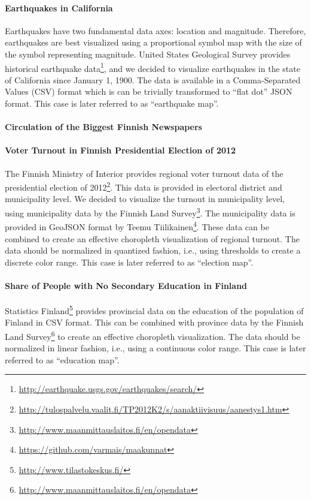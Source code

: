 \paragraph{Earthquakes in California}
Earthquakes have two fundamental data axes: location and magnitude. Therefore, earthquakes are best visualized using a proportional symbol map with the size of the symbol representing magnitude. United States Geological Survey provides historical earthquake data\footnote{\url{http://earthquake.usgs.gov/earthquakes/search/}}, and we decided to visualize earthquakes in the state of California since January 1, 1900. The data is available in a Comma-Separated Values (CSV) format which is can be trivially transformed to ``flat dot'' JSON format. This case is later referred to as ``earthquake map''.

\paragraph{Circulation of the Biggest Finnish Newspapers}

\paragraph{Voter Turnout in Finnish Presidential Election of 2012}
The Finnish Ministry of Interior provides regional voter turnout data of the presidential election of 2012\footnote{\url{http://tulospalvelu.vaalit.fi/TP2012K2/s/aanaktiivisuus/aanestys1.htm}}. This data is provided in electoral district and municipality level. We decided to visualize the turnout in municipality level, using municipality data by the Finnish Land Survey\footnote{\url{http://www.maanmittauslaitos.fi/en/opendata}}. The municipality data is provided in GeoJSON format by Teemu Tiilikainen\footnote{\url{https://github.com/varmais/maakunnat}}. These data can be combined to create an effective choropleth visualization of regional turnout. The data should be normalized in quantized fashion, i.e., using thresholds to create a discrete color range. This case is later referred to as ``election map''.

\paragraph{Share of People with No Secondary Education in Finland}
Statistics Finland\footnote{\url{http://www.tilastokeskus.fi/}} provides provincial data on the education of the population of Finland in CSV format. This can be combined with province data by the Finnish Land Survey\footnote{\url{http://www.maanmittauslaitos.fi/en/opendata}} to create an effective choropleth visualization. The data should be normalized in linear fashion, i.e., using a continuous color range. This case is later referred to as ``education map''.

